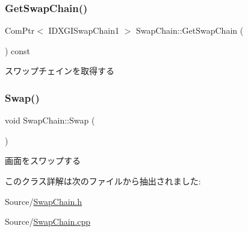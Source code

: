 \mbox{\label{class_swap_chain_a4653a1350dd35b0b9d55ee098b02f82a}} 
\subsubsection{\texorpdfstring{Get\+Swap\+Chain()}{GetSwapChain()}}
{\footnotesize\ttfamily Com\+Ptr$<$ I\+D\+X\+G\+I\+Swap\+Chain1 $>$ Swap\+Chain\+::\+Get\+Swap\+Chain (\begin{DoxyParamCaption}{ }\end{DoxyParamCaption}) const}



スワップチェインを取得する 

\mbox{\label{class_swap_chain_abd79852ff31daa97e5fd78ae7701bcf8}} 
\subsubsection{\texorpdfstring{Swap()}{Swap()}}
{\footnotesize\ttfamily void Swap\+Chain\+::\+Swap (\begin{DoxyParamCaption}{ }\end{DoxyParamCaption})}



画面をスワップする 



このクラス詳解は次のファイルから抽出されました\+:\begin{DoxyCompactItemize}
\item 
Source/\mbox{\hyperlink{_swap_chain_8h}{Swap\+Chain.\+h}}\item 
Source/\mbox{\hyperlink{_swap_chain_8cpp}{Swap\+Chain.\+cpp}}\end{DoxyCompactItemize}
